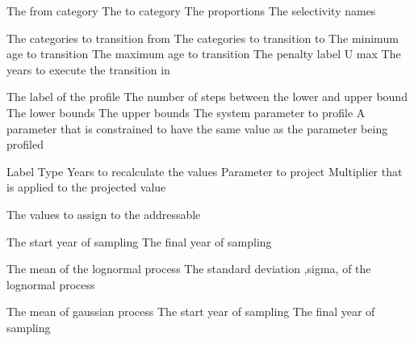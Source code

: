 \par\textbf{}\par
{} {The from category}
 {The to category}
 {The proportions}
 {The selectivity names}
\par\textbf{}\par
{} {The categories to transition from}
 {The categories to transition to}
 {The minimum age to transition}
 {The maximum age to transition}
 {The penalty label}
 {U max}
 {The years to execute the transition in}
\par\par
{} {The label of the profile}
 {The number of steps between the lower and upper bound}
 {The lower bounds}
 {The upper bounds}
 {The system parameter to profile}
 {A parameter that is constrained to have the same value as the parameter being profiled}
\par\par
{} {Label}
 {Type}
 {Years to recalculate the values}
 {Parameter to project}
 {Multiplier that is applied to the projected value}
\par\textbf{}\par
{} {The values to assign to the addressable}
\par\textbf{}\par
{} {The start year of sampling}
 {The final year of sampling}
\par\textbf{}\par
{} {The mean of the lognormal process}
 {The standard deviation ,sigma, of the lognormal process}
\par\textbf{}\par
{} {The mean of gaussian process}
 {The start year of sampling}
 {The final year of sampling}
